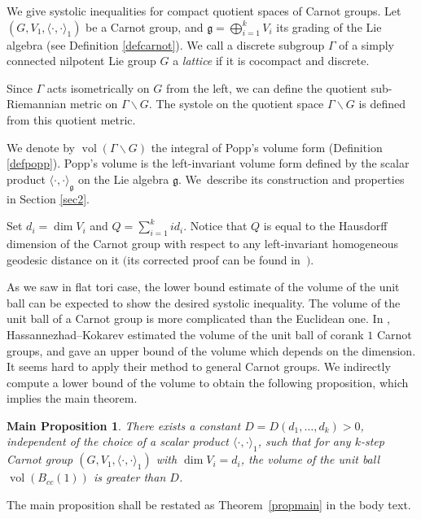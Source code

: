 \documentclass[pdftex]{sigma}
\numberwithin{equation}{section}
\newtheorem*{main}{Main Proposition}
 { \theoremstyle{definition}
\newtheorem{Definition}[Theorem]{Definition}
\newtheorem{Note}[Theorem]{Note}
\newtheorem{Example}[Theorem]{Example}
\newtheorem{Remark}[Theorem]{Remark} }
\newcommand{\g}{\mathfrak{g}}
\begin{document}
We give systolic inequalities for compact quotient spaces of Carnot groups.
Let $(G,V_1,\langle\cdot,\cdot\rangle_1)$ be a Carnot group,
and $\g=\bigoplus_{i=1}^k V_i$ its grading of the Lie algebra
(see Definition \ref{defcarnot}).
We call a discrete subgroup $\Gamma$ of a simply connected nilpotent Lie group $G$ a \textit{lattice} if it is cocompact and discrete.

Since $\Gamma$ acts isometrically on $G$ from the left,
we can define the quotient sub-Riemannian metric on $\Gamma\backslash G$.
The systole on the quotient space $\Gamma\backslash G$ is defined from this quotient metric.

We denote by $\operatorname{vol}(\Gamma\backslash G)$ the integral of Popp's volume form (Definition \ref{defpopp}).
Popp's volume is the left-invariant volume form defined by the scalar product $\langle\cdot,\cdot\rangle_{\g}$ on the Lie algebra $\g$.
We~describe its construction and properties in Section \ref{sec2}.

Set $d_i=\dim V_i$ and $Q=\sum_{i=1}^kid_i$.
Notice that $Q$ is equal to the Hausdorff dimension of the Carnot group with respect to any left-invariant homogeneous geodesic distance on it \cite{mit} $($its corrected proof can be found in~\cite{bel}$)$.

As we saw in flat tori case,
the lower bound estimate of the volume of the unit ball can be expected to show the desired systolic inequality.
The volume of the unit ball of a Carnot group is more complicated than the Euclidean one.
In \cite{has},
Hassannezhad--Kokarev estimated the volume of the unit ball of corank $1$ Carnot groups,
and gave an upper bound of the volume which depends on the dimension.
It seems hard to apply their method to general Carnot groups.
We indirectly compute a lower bound of the volume to obtain the following proposition,
which implies the main theorem.

\begin{main}
 There exists a constant $D=D(d_1,\dots,d_k)>0$,
 independent of the choice of a scalar product $\langle\cdot,\cdot\rangle_1$,
 such that for any $k$-step Carnot group $(G,V_1,\langle\cdot,\cdot\rangle_1)$ with $\dim V_i=d_i$,
 the volume of the unit ball $\operatorname{vol}(B_{cc}(1))$ is greater than $D$.
\end{main}

The main proposition shall be restated as Theorem~\ref{propmain} in the body text.
\end{document}
